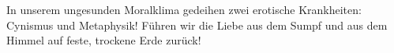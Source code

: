 In unserem ungesunden Moralklima gedeihen zwei erotische Krankheiten: Cynismus und Metaphysik! Führen wir die Liebe aus dem Sumpf und aus dem Himmel auf feste, trockene Erde zurück!
\par

